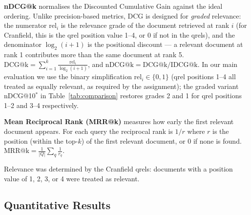 \documentclass{svproc}
\begin{document}
    \textbf{nDCG@k} normalises the Discounted Cumulative Gain against the ideal ordering. Unlike precision-based metrics, DCG is designed for \emph{graded} relevance: the numerator $\mathrm{rel}_i$ is the relevance grade of the document retrieved at rank $i$ (for Cranfield, this is the qrel position value 1--4, or 0 if not in the qrels), and the denominator $\log_2(i+1)$ is the positional discount --- a relevant document at rank 1 contributes more than the same document at rank 5. $\mathrm{DCG@k} = \sum_{i=1}^{k} \frac{\mathrm{rel}_i}{\log_2(i+1)}$, and $\mathrm{nDCG@k} = \mathrm{DCG@k} / \mathrm{IDCG@k}$. In our main evaluation we use the binary simplification $\mathrm{rel}_i \in \{0,1\}$ (qrel positions 1--4 all treated as equally relevant, as required by the assignment); the graded variant nDCG@10$^*$ in Table~\ref{tab:comparison} restores grades 2 and 1 for qrel positions 1--2 and 3--4 respectively.

    \textbf{Mean Reciprocal Rank (MRR@k)} measures how early the first relevant document appears. For each query the reciprocal rank is $1/r$ where $r$ is the position (within the top-$k$) of the first relevant document, or 0 if none is found. $\mathrm{MRR@k} = \frac{1}{|Q|} \sum_{q} \frac{1}{r_q}$.

    Relevance was determined by the Cranfield qrels: documents with a position value of 1, 2, 3, or 4 were treated as relevant.

    \subsection{Quantitative Results}
\end{document}
